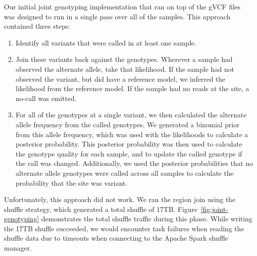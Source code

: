 \documentclass[phd]{ucbthesis}
\begin{document}
Our initial joint genotyping implementation that ran on top of the gVCF files
was designed to run in a single pass over all of the samples. This approach
contained three steps:

\begin{enumerate}
\item Identify all variants that were called in at least one sample.
\item Join these variants back against the genotypes. Wherever a sample had
  observed the alternate allele, take that likelihood. If the sample had not
  observed the variant, but did have a reference model, we inferred the
  likelihood from the reference model. If the sample had no reads at the site,
  a no-call was emitted.
\item For all of the genotypes at a single variant, we then calculated the
  alternate allele frequency from the called genotypes. We generated a binomial
  prior from this allele frequency, which was used with the likelihoods to
  calculate a posterior probability. This posterior probability was then used to
  calculate the genotype quality for each sample, and to update the called
  genotype if the call was changed. Additionally, we used the posterior
  probabilities that no alternate allele genotypes were called across all
  samples to calculate the probability that the site was variant.
\end{enumerate}

Unfortunately, this approach did not work. We ran the region join using the
shuffle strategy, which generated a total shuffle of 17TB.
Figure~\ref{fig:joint-genotyping} demonstrates the total shuffle traffic during
this phase. While writing the 17TB shuffle succeeded, we would encounter task
failures when reading the shuffle data due to timeouts when connecting to the
Apache Spark shuffle manager.
\end{document}

